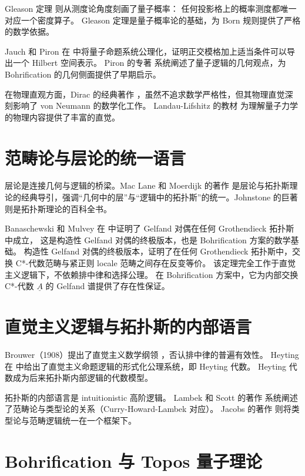 \documentclass[10pt, openany]{book}
\begin{document}
Gleason 定理 \cite{Gleason1957} 则从测度论角度刻画了量子概率：
任何投影格上的概率测度都唯一对应一个密度算子。
Gleason 定理是量子概率论的基础，为 Born 规则提供了严格的数学依据。

Jauch 和 Piron 在 \cite{JauchPiron1969} 中将量子命题系统公理化，证明正交模格加上适当条件可以导出一个 Hilbert 空间表示。
Piron 的专著 \cite{Piron1976} 系统阐述了量子逻辑的几何观点，为 Bohrification 的几何侧面提供了早期启示。

在物理直观方面，Dirac 的经典著作 \cite{Dirac1930} ，虽然不追求数学严格性，但其物理直觉深刻影响了 von Neumann 的数学化工作。
Landau-Lifshitz 的教材 \cite{LandauLifshitz1958} 为理解量子力学的物理内容提供了丰富的直觉。


\section{范畴论与层论的统一语言}

层论是连接几何与逻辑的桥梁。Mac Lane 和 Moerdijk 的著作 \cite{MacLaneMoerdijk1994} 是层论与拓扑斯理论的经典导引，强调“几何中的层”与“逻辑中的拓扑斯”的统一。Johnstone 的巨著 \cite{Johnstone2002a,Johnstone2002b} 则是拓扑斯理论的百科全书。

Banaschewski 和 Mulvey 在 \cite{BanaschewskiMulvey2006} 中证明了 Gelfand 对偶在任何 Grothendieck 拓扑斯中成立，
这是构造性 Gelfand 对偶的终极版本，也是 Bohrification 方案的数学基础。
构造性 Gelfand 对偶的终极版本，证明了在任何 Grothendieck 拓扑斯中，交换 C*-代数范畴与紧正则 locale 范畴之间存在反变等价。
该定理完全工作于直觉主义逻辑下，不依赖排中律和选择公理。
在 Bohrification 方案中，它为内部交换 C*-代数 \(\underline{A}\) 的 Gelfand 谱提供了存在性保证。

\section{直觉主义逻辑与拓扑斯的内部语言}

Brouwer（1908）提出了直觉主义数学纲领 \cite{Brouwer1908}，否认排中律的普遍有效性。
Heyting 在 \cite{Heyting1930} 中给出了直觉主义命题逻辑的形式化公理系统，即 Heyting 代数。
Heyting 代数成为后来拓扑斯内部逻辑的代数模型。

拓扑斯的内部语言是 intuitionistic 高阶逻辑。
Lambek 和 Scott 的著作 \cite{LambekScott1986} 系统阐述了范畴论与类型论的关系（Curry-Howard-Lambek 对应）。
Jacobs 的著作 \cite{Jacobs1999} 则将类型论与范畴逻辑统一在一个框架下。

\section{Bohrification 与 Topos 量子理论}
\end{document}

